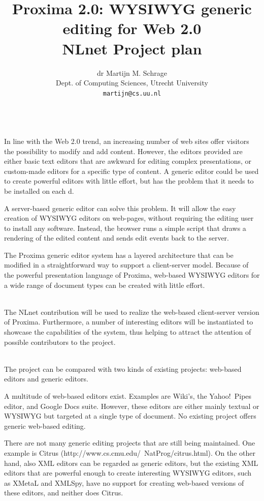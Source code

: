 \documentclass[10pt]{article}
\title{Proxima 2.0: WYSIWYG generic editing for Web 2.0\\
\bigskip
        \large NLnet Project plan}
\author{dr Martijn M. Schrage\\
        \small Dept. of Computing Sciences, Utrecht University\\
        \small {\tt martijn@cs.uu.nl}
        }
\date{}
\begin{document}
\maketitle


\\
In line with the Web 2.0 trend, an increasing number of web sites offer visitors the possibility to modify and add content. However, the editors provided are either basic text editors that are awkward for editing complex presentations, or custom-made editors for a specific type of content. A generic editor could be used to create powerful editors with little effort, but has the problem that it needs to be installed on each d.

A server-based generic editor can solve this problem. It will allow the easy creation of WYSIWYG editors on web-pages, without requiring the editing user to install any software. Instead, the browser runs a simple script that draws a rendering of the edited content and sends edit events back to the server.

The Proxima generic editor system has a layered architecture that can be modified in a straightforward way to support a client-server model. Because of the powerful presentation language of Proxima, web-based WYSIWYG editors for a wide range of document types can be created with little effort.

\\
The NLnet contribution will be used to realize the web-based client-server version of Proxima. Furthermore, a number of interesting editors will be instantiated to showcase the capabilities of the system, thus helping to  attract the attention of possible contributors to the project.


\\
The project can be compared with two kinds of existing projects: web-based editors and generic editors.

A multitude of web-based editors exist. Examples are Wiki's, the Yahoo!\ Pipes editor, and Google Docs suite. However, these editors are either mainly textual or WYSIWYG but targeted at a single type of document. No existing project offers generic web-based editing. 

There are not many generic editing projects that are still being maintained. One example is Citrus (http://www.cs.cmu.edu/~NatProg/citrus.html). On the other hand, also XML editors can be regarded as generic editors, but the existing XML editors that are powerful enough to create interesting WYSIWYG editors, such as XMetaL and XMLSpy, have no support for creating web-based versions of these editors, and neither does Citrus.
\end{document}
